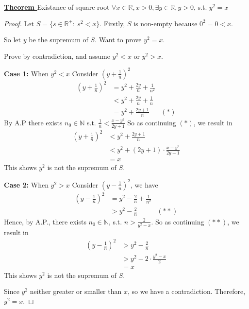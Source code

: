 \documentclass[a4paper, 12pt]{article}
\begin{document}
\vspace{5mm}
\textbf{\underline{Theorem }} Existance of square root
$\forall x\in \mathbb{R}, x > 0, \exists y\in \mathbb{R}, y > 0$, s.t. $y^2 = x$

\begin{proof}
    Let $S = \{s\in\mathbb{R^+} :~ s^2 < x\}$.
    Firstly, $S$ is non-empty because $0^2 = 0 < x$. 

    So let $y$ be the supremum of $S$. Want to prove $y^2 = x$.

    Prove by contradiction, and assume $y^2 < x$ or $y^2 > x$.

    \textbf{Case 1: } When $y^2 < x$
    Consider $(y + \frac{1}{n})^2$
    $$\begin{aligned}
        (y + \frac{1}{n})^2 &= y^2 + \frac{2y}{n} + \frac{1}{n^2}\\
                            &< y^2 + \frac{2y}{n} + \frac{1}{n}\\
                            &= y^2 + \frac{2y + 1}{n}   &(*)
    \end{aligned}$$
    By A.P there exists $n_0\in \mathbb{N}$ s.t. 
    $\frac{1}{n} < \frac{x - y^2}{2y + 1}$
    So as continuing $(*)$, we result in 
    $$\begin{aligned}
        (y + \frac{1}{n})^2 &< y^2 + \frac{2y + 1}{n}\\
                            &< y^2 + (2y + 1)\cdot \frac{x - y^2}{2y + 1}\\
                            &= x
    \end{aligned}$$
    This shows $y^2$ is not the supremum of $S$.

    \textbf{Case 2:} When $y^2 > x$
    Consider $(y - \frac{1}{n})^2$, we have
    $$\begin{aligned}
        (y - \frac{1}{n})^2 &= y^2 - \frac{2}{n} + \frac{1}{n^2}\\
                            &> y^2 - \frac{2}{n}  &(**)
    \end{aligned}$$
    Hence, by A.P., there exists $n_0 \in \mathbb{N}$, s.t. 
    $n > \frac{2}{y^2 - x}$.
    So as continuing $(**)$, we result in 
    $$\begin{aligned}
        (y - \frac{1}{n})^2 &> y^2 - \frac{2}{n}\\
                            &> y^2 - 2 \cdot \frac{y^2 - x}{2}\\
                            &= x
    \end{aligned}$$
    This shows $y^2$ is not the supremum of $S$.

    Since $y^2$ neither greater or smaller than $x$, so we have a contradiction.
    Therefore, $y^2 = x$.
\end{proof}
\end{document}
